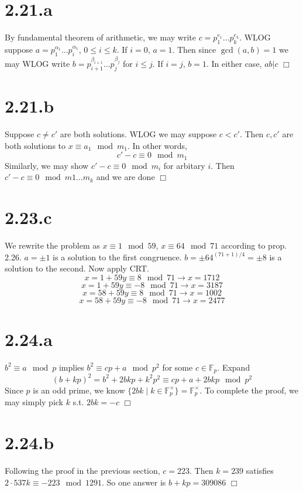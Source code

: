 \documentclass{article}
\begin{document}
\section*{2.21.a}
By fundamental theorem of arithmetic, we may write $c = p_1^{e_1} \dots p_k^{e_k}$. WLOG suppose $a = p_1^{\alpha_1} \dots p_{i}^{\alpha_1}$, $0 \leq i \leq k$. If $i = 0$, $a = 1$. Then since $\gcd(a,b) = 1$ we may WLOG write $b = p_{i+1}^{\beta_{i+1}} \dots p_j^{\beta_j}$ for $i \leq j$. If $i = j$, $b = 1$. In either case, $ab \vert c$ $\Box$
\section*{2.21.b}
Suppose $c \neq c'$ are both solutions. WLOG we may suppose $c < c'$. Then $c,c'$ are both solutions to $x \equiv a_1 \mod m_1$. In other words,
$$c' - c \equiv 0 \mod m_1$$
Similarly, we may show $c' - c \equiv 0 \mod m_i$ for arbitary $i$. Then $c' - c \equiv 0 \mod m1\dots m_k$ and we are done $\Box$

\section*{2.23.c}
We rewrite the problem as $x \equiv 1 \mod 59$, $x \equiv 64 \mod 71$ according to prop. 2.26. $a = \pm 1$ is a solution to the first congruence. $b = \pm 64^{(71+1)/4} = \pm 8$ is a solution to the second. Now apply CRT.
$$x = 1 + 59y \equiv 8 \mod 71 \to x = 1712$$
$$x = 1 + 59y \equiv -8 \mod 71 \to x = 3187$$
$$x = 58 + 59y \equiv 8 \mod 71 \to x = 1002$$
$$x = 58 + 59y \equiv -8 \mod 71 \to x = 2477$$

\section*{2.24.a}
$b^2 \equiv a \mod p$ implies $b^2 \equiv cp + a \mod p^2$ for some $c \in \mathbb{F}_p$. Expand
$$(b+kp)^2 = b^2 + 2bkp + k^2p^2 \equiv cp + a + 2bkp \mod p^2$$
Since $p$ is an odd prime, we know $\{2bk \;|\; k \in \mathbb{F}_p^\times\} = \mathbb{F}_p^\times$. To complete the proof, we may simply pick $k$ s.t. $2bk = -c$ $\Box$

\section*{2.24.b}
Following the proof in the previous section, $c = 223$. Then $k = 239$ satisfies $2\cdot537k \equiv -223 \mod 1291$. So one answer is $b + kp = 309086$ $\Box$
\end{document}
